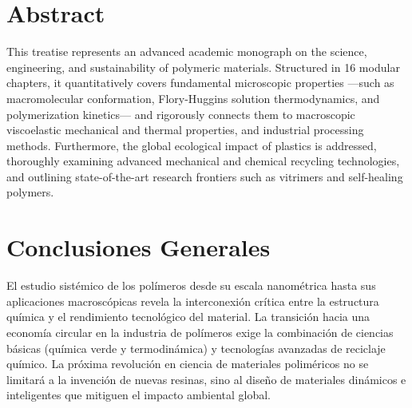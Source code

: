 \documentclass[twoside,11pt,a4paper]{book}
\begin{document}
\chapter*{Abstract}
This treatise represents an advanced academic monograph on the science, engineering, and sustainability of polymeric materials. Structured in 16 modular chapters, it quantitatively covers fundamental microscopic properties —such as macromolecular conformation, Flory-Huggins solution thermodynamics, and polymerization kinetics— and rigorously connects them to macroscopic viscoelastic mechanical and thermal properties, and industrial processing methods. Furthermore, the global ecological impact of plastics is addressed, thoroughly examining advanced mechanical and chemical recycling technologies, and outlining state-of-the-art research frontiers such as vitrimers and self-healing polymers.

\tableofcontents
\listoffigures
\listoftables

\mainmatter


















\backmatter

\chapter{Conclusiones Generales}
El estudio sistémico de los polímeros desde su escala nanométrica hasta sus aplicaciones macroscópicas revela la interconexión crítica entre la estructura química y el rendimiento tecnológico del material. La transición hacia una economía circular en la industria de polímeros exige la combinación de ciencias básicas (química verde y termodinámica) y tecnologías avanzadas de reciclaje químico. La próxima revolución en ciencia de materiales poliméricos no se limitará a la invención de nuevas resinas, sino al diseño de materiales dinámicos e inteligentes que mitiguen el impacto ambiental global.




\appendix


\end{document}
